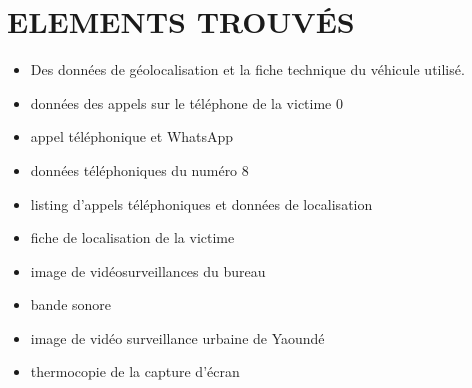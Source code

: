 \documentclass[a4paper,12pt]{report}
\begin{document}
\section{ELEMENTS TROUVÉS}
\begin{itemize}
    \item Des données de géolocalisation et la fiche technique du véhicule utilisé. 
    \item  données des appels sur le téléphone de la victime 0
    \item appel téléphonique et WhatsApp 
    \item données téléphoniques du numéro 8
    \item listing d'appels téléphoniques et données de localisation
    \item fiche de localisation de la victime
    \item image de vidéosurveillances du bureau
    \item bande sonore 
    \item image de vidéo surveillance urbaine de Yaoundé 
    \item thermocopie de la capture d'écran 
\end{itemize}
\end{document}
